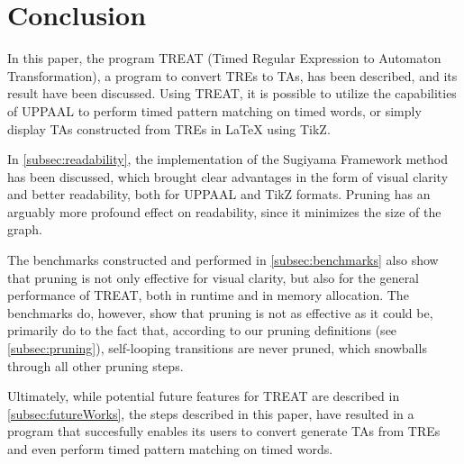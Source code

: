 \section{Conclusion}


In this paper, the program TREAT (Timed Regular Expression to Automaton Transformation), a program to convert TREs to TAs, has been described, and its result have been discussed.
Using TREAT, it is possible to utilize the capabilities of UPPAAL to perform timed pattern matching on timed words, or simply display TAs constructed from TREs in LaTeX using TikZ.

In \cref{subsec:readability}, the implementation of the Sugiyama Framework method has been discussed, which brought clear advantages in the form of visual clarity and better readability, both for UPPAAL and TikZ formats.
Pruning has an arguably more profound effect on readability, since it minimizes the size of the graph.

The benchmarks constructed and performed in \cref{subsec:benchmarks} also show that pruning is not only effective for visual clarity, but also for the general performance of TREAT, both in runtime and in memory allocation.
The benchmarks do, however, show that pruning is not as effective as it could be, primarily do to the fact that, according to our pruning definitions (see \cref{subsec:pruning}), self-looping transitions are never pruned, which snowballs through all other pruning steps.

Ultimately, while potential future features for TREAT are described in \cref{subsec:futureWorks}, the steps described in this paper, have resulted in a program that succesfully enables its users to convert generate TAs from TREs and even perform timed pattern matching on timed words.